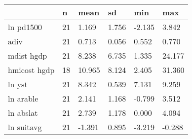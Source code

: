 \begin{table}[htbp]
\begin{tabular}{|l|l|l|l|l|l|}\hline  
 & n  & mean  & sd  & min  & max  \\ \hline  
ln pd1500 &        21 &     1.169 &     1.756 &    -2.135 &     3.842 \\ \hline 
adiv &        21 &     0.713 &     0.056 &     0.552 &     0.770 \\ \hline 
mdist hgdp &        21 &     8.238 &     6.735 &     1.335 &    24.177 \\ \hline 
hmicost hgdp &        18 &    10.965 &     8.124 &     2.405 &    31.360 \\ \hline 
ln yst &        21 &     8.342 &     0.539 &     7.131 &     9.259 \\ \hline 
ln arable &        21 &     2.141 &     1.168 &    -0.799 &     3.512 \\ \hline 
ln abslat &        21 &     2.739 &     1.178 &     0.000 &     4.094 \\ \hline 
ln suitavg &        21 &    -1.391 &     0.895 &    -3.219 &    -0.288 \\ \hline 
  \end{tabular}
\end{table}
